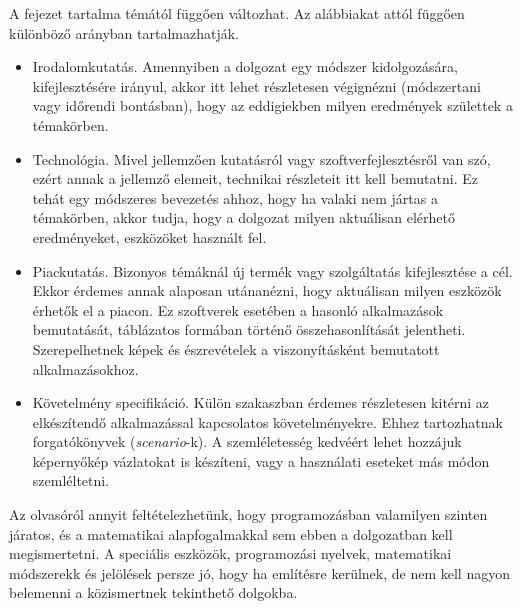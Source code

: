 A fejezet tartalma témától függően változhat. Az alábbiakat attól függően különböző arányban tartalmazhatják.
\begin{itemize}
\item Irodalomkutatás. Amennyiben a dolgozat egy módszer kidolgozására, kifejlesztésére irányul, akkor itt lehet részletesen végignézni (módszertani vagy időrendi bontásban), hogy az eddigiekben milyen eredmények születtek a témakörben.
\item Technológia. Mivel jellemzően kutatásról vagy szoftverfejlesztésről van szó, ezért annak a jellemző elemeit, technikai részleteit itt kell bemutatni.
Ez tehát egy módszeres bevezetés ahhoz, hogy ha valaki nem jártas a témakörben, akkor tudja, hogy a dolgozat milyen aktuálisan elérhető eredményeket, eszközöket használt fel.
\item Piackutatás. Bizonyos témáknál új termék vagy szolgáltatás kifejlesztése a cél.
Ekkor érdemes annak alaposan utánanézni, hogy aktuálisan milyen eszközök érhetők el a piacon.
Ez szoftverek esetében a hasonló alkalmazások bemutatását, táblázatos formában történő összehasonlítását jelentheti.
Szerepelhetnek képek és észrevételek a viszonyításként bemutatott alkalmazásokhoz.
\item Követelmény specifikáció. Külön szakaszban érdemes részletesen kitérni az elkészítendő alkalmazással kapcsolatos követelményekre.
Ehhez tartozhatnak forgatókönyvek (\textit{scenario}-k).
A szemléletesség kedvéért lehet hozzájuk képernyőkép vázlatokat is készíteni, vagy a használati eseteket más módon szemléltetni.
\end{itemize}


Az olvasóról annyit feltételezhetünk, hogy programozásban valamilyen szinten járatos, és a matematikai alapfogalmakkal sem ebben a dolgozatban kell megismertetni.
A speciális eszközök, programozási nyelvek, matematikai módszerekk és jelölések persze jó, hogy ha említésre kerülnek, de nem kell nagyon belemenni a közismertnek tekinthető dolgokba.
